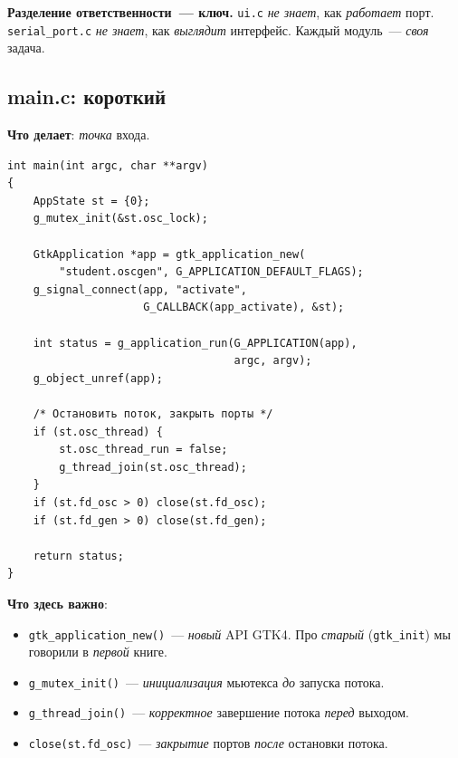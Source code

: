 \begin{ideabox}
\textbf{Разделение ответственности~--- ключ.} \texttt{ui.c}
\emph{не знает}, как \emph{работает} порт. \texttt{serial\_port.c}
\emph{не знает}, как \emph{выглядит} интерфейс. Каждый
модуль~--- \emph{своя} задача.
\end{ideabox}

\subsection{main.c: короткий}

\textbf{Что делает}: \emph{точка} входа.

\begin{listing}[htbp]
\begin{verbatim}
int main(int argc, char **argv)
{
    AppState st = {0};
    g_mutex_init(&st.osc_lock);

    GtkApplication *app = gtk_application_new(
        "student.oscgen", G_APPLICATION_DEFAULT_FLAGS);
    g_signal_connect(app, "activate",
                     G_CALLBACK(app_activate), &st);

    int status = g_application_run(G_APPLICATION(app),
                                   argc, argv);
    g_object_unref(app);

    /* Остановить поток, закрыть порты */
    if (st.osc_thread) {
        st.osc_thread_run = false;
        g_thread_join(st.osc_thread);
    }
    if (st.fd_osc > 0) close(st.fd_osc);
    if (st.fd_gen > 0) close(st.fd_gen);

    return status;
}
\end{verbatim}
\caption{\texttt{main.c}~--- точка входа}
\label{lst:arch-main}
\end{listing}

\textbf{Что здесь важно}:

\begin{itemize}
    \item \texttt{gtk\_application\_new()}~--- \emph{новый}
          API GTK4. Про \emph{старый} (\texttt{gtk\_init})
          мы говорили в \emph{первой} книге.
    \item \texttt{g\_mutex\_init()}~--- \emph{инициализация}
          мьютекса \emph{до} запуска потока.
    \item \texttt{g\_thread\_join()}~--- \emph{корректное}
          завершение потока \emph{перед} выходом.
    \item \texttt{close(st.fd\_osc)}~--- \emph{закрытие}
          портов \emph{после} остановки потока.
\end{itemize}

